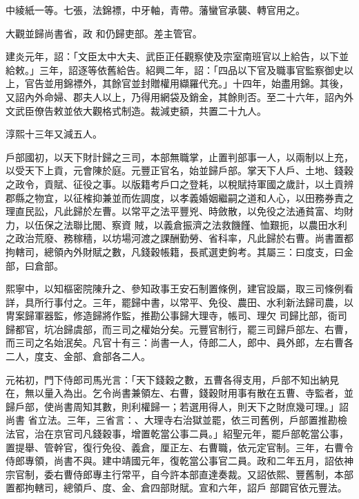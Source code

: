 \begin{pinyinscope}
 中綾紙一等。七張，法錦褾，中牙軸，青帶。藩蠻官承襲、轉官用之。



 大觀並歸尚書省，政
 和仍歸吏部。差主管官。



 建炎元年，詔：「文臣太中大夫、武臣正任觀察使及宗室南班官以上給告，以下並給敕。」三年，詔逐等依舊給告。紹興二年，詔：「四品以下官及職事官監察御史以上，官告並用錦褾外，其餘官並封贈權用纈羅代充。」十四年，始盡用錦。其後，又詔內外命婦、郡夫人以上，乃得用網袋及銷金，其餘則否。至二十六年，詔內外文武臣僚告敕並依大觀格式制造。裁減吏額，共置二十九人。



 淳熙十三年又減五人。



 戶部國初，以天下財計歸之三司，本部無職掌，止置判部事一人，以兩制以上充，以受天下上貢，元會陳於庭。元豐正官名，始並歸戶部。掌天下人戶、土地、錢穀之政令，貢賦、征役之事。以版籍考戶口之登耗，以稅賦持軍國之歲計，以土貢辨郡縣之物宜，以征榷抑兼並而佐調度，以孝義婚姻繼嗣之道和人心，以田務券責之理直民訟，凡此歸於左曹。以常平之法平豐兇、時斂散，以免役之法通貧富、均財力，以伍保之法聯比閭、察資
 賊，以義倉振濟之法救饑饉、恤艱扼，以農田水利之政治荒廢、務稼穡，以坊場河渡之課酬勤勞、省科率，凡此歸於右曹。尚書置都拘轄司，總領內外財賦之數，凡錢穀帳籍，長貳選吏鉤考。其屬三：曰度支，曰金部，曰倉部。



 熙寧中，以知樞密院陳升之、參知政事王安石制置條例，建官設屬，取三司條例看詳，具所行事付之。三年，罷歸中書，以常平、免役、農田、水利新法歸司農，以冑案歸軍器監，修造歸將作監，推勘公事歸大理寺，帳司、理欠
 司歸比部，衙司歸都官，坑冶歸虞部，而三司之權始分矣。元豐官制行，罷三司歸戶部左、右曹，而三司之名始泯矣。凡官十有三：尚書一人，侍郎二人，郎中、員外郎，左右曹各二人，度支、金部、倉部各二人。



 元祐初，門下侍郎司馬光言：「天下錢穀之數，五曹各得支用，戶部不知出納見在，無以量入為出。乞令尚書兼領左、右曹，錢穀財用事有散在五曹、寺監者，並歸戶部，使尚書周知其數，則利權歸一；若選用得人，則天下之財庶幾可理。」詔尚書
 省立法。三年，三省言：、大理寺右治獄並罷，依三司舊例，戶部置推勘檢法官，治在京官司凡錢穀事，增置乾當公事二員。」紹聖元年，罷戶部乾當公事，置提舉、管幹官，復行免役、義倉，厘正左、右曹職，依元定官制。三年，右曹令侍郎專領，尚書不與。建中靖國元年，復乾當公事官二員。政和二年五月，詔依神宗官制，委右曹侍郎專主行常平，自今許本部直達奏裁。又詔依熙、豐舊制，本部置都拘轄司，總領戶、度、金、倉四部財賦。宣和六年，詔戶
 部闢官依元豐法。




\end{pinyinscope}
